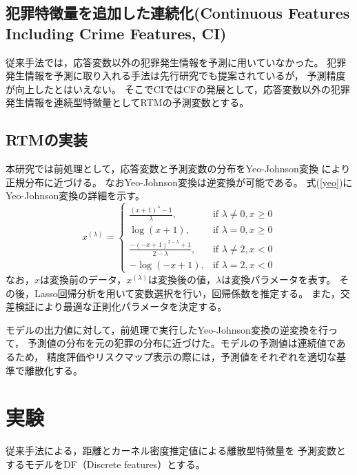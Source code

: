 \subsection{犯罪特徴量を追加した連続化(Continuous  Features Including Crime Features, CI)}
従来手法\cite{caplan2015risk}では，応答変数以外の犯罪発生情報を予測に用いていなかった。
犯罪発生情報を予測に取り入れる手法は先行研究\cite{大山智也2020日本}でも提案されているが，
予測精度が向上したとはいえない。
そこでCIではCFの発展として，応答変数以外の犯罪発生情報を連続型特徴量としてRTMの予測変数とする。
\subsection{RTMの実装}
本研究では前処理として，応答変数と予測変数の分布をYeo-Johnson変換\cite{weisberg2001yeo}
により正規分布に近づける。
なおYeo-Johnson変換は逆変換が可能である。
式(\ref{yeo})にYeo-Johnson変換の詳細を示す。
\begin{equation}\label{yeo}
   x^{(\lambda)} =
   \begin{cases} 
   \frac{(x+1)^\lambda - 1}{\lambda}, & \text{if } \lambda \neq 0, x \geq 0 \\ 
   \log(x+1), & \text{if } \lambda = 0, x \geq 0 \\ 
   \frac{-(-x+1)^{2-\lambda} + 1}{2-\lambda}, & \text{if } \lambda \neq 2, x < 0 \\ 
   -\log(-x+1), & \text{if } \lambda = 2, x < 0
   \end{cases}
\end{equation}
なお，$x$は変換前のデータ，$x^{(\lambda)}$は変換後の値，$\lambda$は変換パラメータを表す。
その後，Lasso回帰分析を用いて変数選択を行い，回帰係数を推定する。
また，交差検証により最適な正則化パラメータを決定する。

モデルの出力値に対して，前処理で実行したYeo-Johnson変換の逆変換を行って，
予測値の分布を元の犯罪の分布に近づけた。モデルの予測値は連続値であるため，
精度評価やリスクマップ表示の際には，予測値をそれぞれを適切な基準で離散化する。
\section{実験}
従来手法\cite{caplan2015risk}による，距離とカーネル密度推定値\cite{bishop2007}による離散型特徴量を
予測変数とするモデルをDF（Discrete features）とする。
